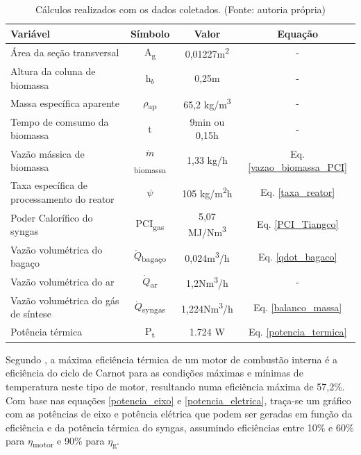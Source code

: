 \begin{table}[h]
	\centering
	\caption{Cálculos realizados com os dados coletados. (Fonte: autoria própria)}
	\begin{tabular}{|l|c|c|c|}
		\hline
		Variável & Símbolo & Valor & Equação \\
		\hline
		
		Área da seção transversal & A\textsubscript{g} & 0,01227m\textsuperscript{2} & - \\
		
		Altura da coluna de biomassa & h$_b$ & 0,25m & -\\
		
		Massa específica aparente & $\rho$\textsubscript{ap} & 65,2 kg/m\textsuperscript{3} & - \\
		
		Tempo de comsumo da biomassa & t & 9min ou 0,15h & -\\
		
		Vazão mássica de biomassa & $\dot{m}$\textsubscript{biomassa} & 1,33 kg/h & Eq. \ref{vazao_biomassa_PCI}\\
		
		Taxa específica de processamento do reator & $\psi$ & 105 kg/m\textsuperscript{2}h & Eq. \ref{taxa_reator}\\
		
		\rowcolor{lightgray} Poder Calorífico do syngas & PCI\textsubscript{gas} & 5,07 MJ/Nm\textsuperscript{3} & Eq. \ref{PCI_Tiangco}\\
		
		Vazão volumétrica do bagaço & $\dot{Q}$\textsubscript{bagaço} & 0,024m\textsuperscript{3}/h & Eq. \ref{qdot_bagaco}\\
		
		Vazão volumétrica do ar & $\dot{Q}$\textsubscript{ar} & 1,2Nm\textsuperscript{3}/h & -\\
		
		Vazão volumétrica do gás de síntese & $\dot{Q}$\textsubscript{syngas} & 1,224Nm\textsuperscript{3}/h & Eq. \ref{balanco_massa}\\
		
		\rowcolor{lightgray} Potência térmica & P\textsubscript{t} & 1.724 W & Eq. \ref{potencia_termica}\\
		
		\hline
\end{tabular}
\label{tabela_resultados_2}
\end{table}	

Segundo \cite{brunetti2012}, a máxima eficiência térmica de um motor de combustão interna é a eficiência do ciclo de Carnot para as condições máximas e mínimas de temperatura neste tipo de motor, resultando numa eficiência máxima de 57,2\%.
Com base nas equações \ref{potencia_eixo} e \ref{potencia_eletrica}, traça-se um gráfico com as potências de eixo e potência elétrica que podem ser geradas em função da eficiência e da potência térmica do syngas, assumindo eficiências entre 10\% e 60\% para $\eta$\textsubscript{motor} e 90\% para $\eta$\textsubscript{g}.

